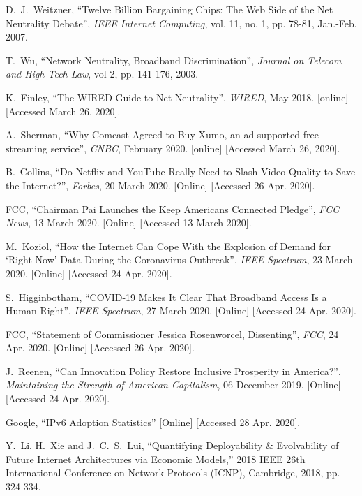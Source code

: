 \documentclass[journal]{IEEEtran}
\begin{document}
\begin{thebibliography}{6}
 D.~J.~Weitzner, \enquote{Twelve Billion Bargaining Chips: The Web Side of the Net Neutrality Debate}, \emph{IEEE Internet Computing}, vol. 11, no. 1, pp. 78-81, Jan.-Feb. 2007.

 T.~Wu, \enquote{Network Neutrality, Broadband Discrimination}, \emph{Journal on Telecom and High Tech Law}, vol 2,  pp. 141-176, 2003.

 K.~Finley, \enquote{The WIRED Guide to Net Neutrality}, \emph{WIRED}, May 2018. [online] [Accessed March 26, 2020].

 A.~Sherman, \enquote{Why Comcast Agreed to Buy Xumo, an ad-supported free streaming service}, \emph{CNBC}, February 2020. [online] [Accessed March 26, 2020].

 B.~Collins, \enquote{Do Netflix and YouTube Really Need to Slash Video Quality to Save the Internet?}, \emph{Forbes}, 20 March 2020. [Online] [Accessed 26 Apr. 2020].

 FCC, \enquote{Chairman Pai Launches the Keep Americans Connected Pledge}, \emph{FCC News}, 13 March 2020. [Online] [Accessed 13 March 2020].

 M.~Koziol, \enquote{How the Internet Can Cope With the Explosion of Demand for \enquote*{Right Now} Data During the Coronavirus Outbreak}, \emph{IEEE Spectrum}, 23 March 2020. [Online] [Accessed 24 Apr. 2020].

 S.~Higginbotham, \enquote{COVID-19 Makes It Clear That Broadband Access Is a Human Right}, \emph{IEEE Spectrum}, 27 March 2020. [Online] [Accessed 24 Apr. 2020].

 FCC, \enquote{Statement of Commissioner Jessica Rosenworcel, Dissenting}, \emph{FCC}, 24 Apr. 2020. [Online] [Accessed 26 Apr. 2020].

 J.~Reenen, \enquote{Can Innovation Policy Restore Inclusive Prosperity in America?}, \emph{Maintaining the Strength of American Capitalism}, 06 December 2019. [Online] [Accessed 24 Apr. 2020].

 Google, \enquote{IPv6 Adoption Statistics} [Online] [Accessed 28 Apr. 2020].

 Y.~Li, H.~Xie and J.~C.~S.~Lui, \enquote{Quantifying Deployability \& Evolvability of Future Internet Architectures via Economic Models,} 2018 IEEE 26th International Conference on Network Protocols (ICNP), Cambridge, 2018, pp. 324-334.


\end{thebibliography}
\end{document}
